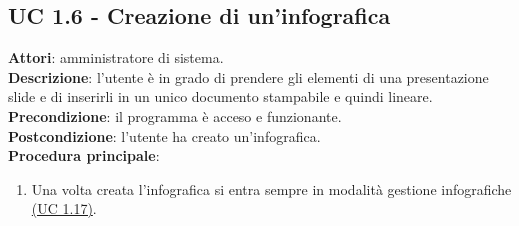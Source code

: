 \subsection{UC 1.6 - Creazione di un'infografica}{
	\label{uc1.6}
	\textbf{Attori}: amministratore di sistema. \\
	\textbf{Descrizione}: l'utente è in grado di prendere gli elementi di una presentazione slide e di inserirli in un unico documento stampabile e quindi lineare. \\
	\textbf{Precondizione}: il programma è acceso e funzionante.	\\
	\textbf{Postcondizione}: l'utente ha creato un'infografica.	\\
	\textbf{Procedura principale}:
	\begin{enumerate}
		\item Una volta creata l'infografica si entra sempre in modalità gestione infografiche \hyperref[uc1.17]{(UC 1.17)}.
	\end{enumerate}
	}
